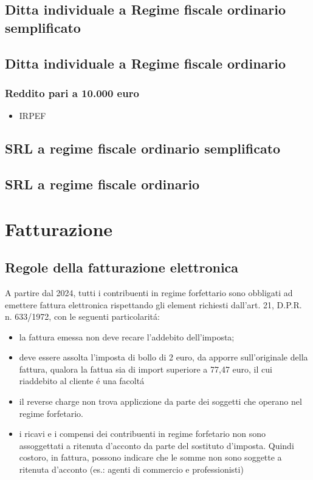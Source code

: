 \documentclass{article}
\begin{document}
\subsection{Ditta individuale a Regime fiscale ordinario semplificato}

\subsection{Ditta individuale a Regime fiscale ordinario}
\subsubsection{Reddito pari a 10.000 euro}
\begin{itemize}
    \item IRPEF 
\end{itemize}

\subsection{SRL a regime fiscale ordinario semplificato}

\subsection{SRL a regime fiscale ordinario}

\section{Fatturazione}

\subsection{Regole della fatturazione elettronica}
A partire dal 2024, tutti i contribuenti in regime forfettario sono obbligati ad emettere fattura elettronica rispettando gli element richiesti dall'art. 21, D.P.R. n. 633/1972, con le seguenti particolarit\'a:
\begin{itemize}
    \item la fattura emessa non deve recare l'addebito dell'imposta;
    \item deve essere assolta l'imposta di bollo di 2 euro, da apporre sull'originale della fattura, qualora la fattua sia di import superiore a 77,47 euro, il cui riaddebito al cliente \'e una facolt\'a
    \item il reverse charge non trova appliczione da parte dei soggetti che operano nel regime forfetario.
    \item i ricavi e i compensi dei contribuenti in regime forfetario non sono assoggettati a ritenuta d'acconto da parte del sostituto d'imposta. Quindi costoro, in fattura, possono indicare che le somme non sono soggette a ritenuta d'acconto (es.: agenti di commercio e professionisti)
\end{itemize}
\end{document}
